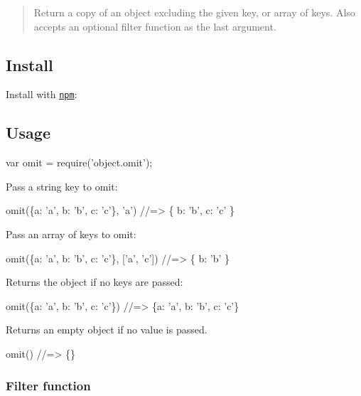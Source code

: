 \begin{quote}
Return a copy of an object excluding the given key, or array of keys. Also accepts an optional filter function as the last argument. \end{quote}


\subsection*{Install}

Install with \href{https://www.npmjs.com/}{\tt npm}\+:




\subsection*{Usage}


\begin{DoxyCode}
var omit = require('object.omit');
\end{DoxyCode}


Pass a string {\ttfamily key} to omit\+:


\begin{DoxyCode}
omit(\{a: 'a', b: 'b', c: 'c'\}, 'a')
//=> \{ b: 'b', c: 'c' \}
\end{DoxyCode}


Pass an array of {\ttfamily keys} to omit\+:


\begin{DoxyCode}
omit(\{a: 'a', b: 'b', c: 'c'\}, ['a', 'c'])
//=> \{ b: 'b' \}
\end{DoxyCode}


Returns the object if no keys are passed\+:


\begin{DoxyCode}
omit(\{a: 'a', b: 'b', c: 'c'\})
//=> \{a: 'a', b: 'b', c: 'c'\}
\end{DoxyCode}


Returns an empty object if no value is passed.


\begin{DoxyCode}
omit()
//=> \{\}
\end{DoxyCode}


\subsubsection*{Filter function}

